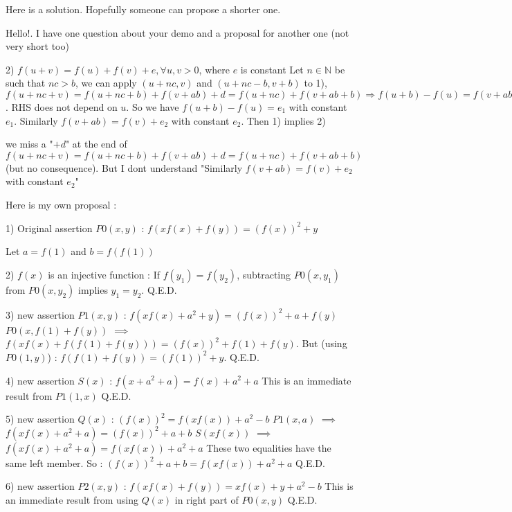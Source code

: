 \begin{solution}
	\begin{tcolorbox}Here is a solution. Hopefully someone can propose a shorter one.\end{tcolorbox}

Hello!. I have one question  about your demo and a proposal for another one (not very short too)

\begin{tcolorbox} 2) $ f(u + v) = f(u) + f(v) + e,\forall u,v > 0$, where $ e$ is constant
Let $ n\in\mathbb N$ be such that $ nc > b$, we can apply $ (u + nc,v)$ and $ (u + nc - b,v + b)$ to 1),
$ f(u + nc + v) = f(u + nc + b) + f(v + ab) + d = f(u + nc) + f(v + ab + b)\Rightarrow f(u + b) - f(u) = f(v + ab + b) - f(v + ab)$.
RHS does not depend on $ u$. So we have $ f(u + b) - f(u) = e_1$ with constant $ e_1$.
Similarly $ f(v + ab) = f(v) + e_2$ with constant $ e_2$.
Then 1) implies 2)\end{tcolorbox}

we miss a "$ +d$" at the end of  $ f(u + nc + v) = f(u + nc + b) + f(v + ab) + d = f(u + nc) + f(v + ab + b)$ (but no consequence).
But I dont understand "Similarly $ f(v + ab) = f(v) + e_2$ with constant $ e_2$"

Here is my own proposal :

1) Original assertion $ P0(x,y)$ : $ f(xf(x)+f(y))=(f(x))^2+y$

Let $ a=f(1)$ and $ b=f(f(1))$

2) $ f(x)$ is an injective function :
If $ f(y_1)=f(y_2)$, subtracting $ P0(x,y_1)$ from $ P0(x,y_2)$ implies $ y_1=y_2$.
Q.E.D.

3) new assertion $ P1(x,y)$ : $ f(xf(x)+a^2+y)=(f(x))^2+a+f(y)$
$ P0(x,f(1)+f(y))$ $ \implies$ $ f(xf(x)+f(f(1)+f(y)))=(f(x))^2+f(1)+f(y)$. But (using $ P0(1,y)$) : $ f(f(1)+f(y))=(f(1))^2+y$.
Q.E.D.

4) new assertion $ S(x)$ : $ f(x+a^2+a)=f(x)+a^2+a$
This is an immediate result from $ P1(1,x)$
Q.E.D.

5) new assertion $ Q(x)$ : $ (f(x))^2=f(xf(x))+a^2-b$ 
$ P1(x,a)$ $ \implies$ $ f(xf(x)+a^2+a)=(f(x))^2+a+b$
$ S(xf(x))$ $ \implies$ $ f(xf(x)+a^2+a)=f(xf(x))+a^2+a$
These two equalities have the same left member. So : $ (f(x))^2+a+b=f(xf(x))+a^2+a$
Q.E.D.

6) new assertion $ P2(x,y)$ : $ f(xf(x)+f(y))=xf(x)+y+a^2-b$
This is an immediate result from using $ Q(x)$ in right part of $ P0(x,y)$
Q.E.D.


\end{solution}

